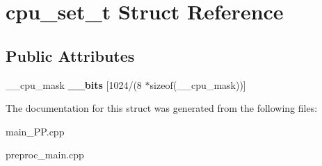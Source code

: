 \hypertarget{structcpu__set__t}{\section{cpu\+\_\+set\+\_\+t Struct Reference}
\label{structcpu__set__t}
}
\subsection*{Public Attributes}
\begin{DoxyCompactItemize}
\item 
\hypertarget{structcpu__set__t_a9f552d99ccc794dfd33e0c0d09a92100}{\+\_\+\+\_\+cpu\+\_\+mask {\bfseries \+\_\+\+\_\+bits} \mbox{[}1024/(8 $\ast$sizeof(\+\_\+\+\_\+cpu\+\_\+mask))\mbox{]}}\label{structcpu__set__t_a9f552d99ccc794dfd33e0c0d09a92100}

\end{DoxyCompactItemize}


The documentation for this struct was generated from the following files\+:\begin{DoxyCompactItemize}
\item 
main\+\_\+\+P\+P.\+cpp\item 
preproc\+\_\+main.\+cpp\end{DoxyCompactItemize}
